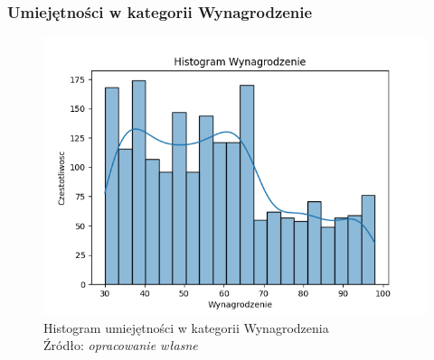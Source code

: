         \subsubsection{Umiejętności w kategorii Wynagrodzenie}
        \begin{figure}[H]
            \centering
            \includegraphics[width=\linewidth]{chapters/Images/hist_wynagrodzenie.png}
            \cprotect\caption{Histogram umiejętności w kategorii Wynagrodzenia\\ Źródło:\textit{ opracowanie własne}}
            \label{fig:hist_wynagrodzenie}
        \end{figure}

